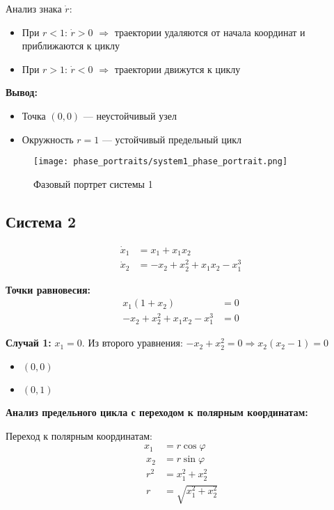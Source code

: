 Анализ знака $\dot{r}$:
\begin{itemize}
\item При $r < 1$: $\dot{r} > 0$ $\Rightarrow$ траектории удаляются от начала координат и приближаются к циклу
\item При $r > 1$: $\dot{r} < 0$ $\Rightarrow$ траектории движутся к циклу
\end{itemize}

\textbf{Вывод:}
\begin{itemize}
\item Точка $(0,0)$ --- неустойчивый узел
\item Окружность $r = 1$ --- устойчивый предельный цикл
\end{itemize}

\begin{figure}[H]
\centering
\texttt{[image: phase\_portraits/system1\_phase\_portrait.png]}
\caption{Фазовый портрет системы 1}
\label{fig:system1_phase_portrait}
\end{figure}

\subsection*{Система 2}

\begin{align}
\dot{x}_1 &= x_1 + x_1 x_2 \\
\dot{x}_2 &= -x_2 + x_2^2 + x_1 x_2 - x_1^3
\end{align}

\textbf{Точки равновесия:}
\begin{align}
x_1(1 + x_2) &= 0 \\
-x_2 + x_2^2 + x_1 x_2 - x_1^3 &= 0
\end{align}

\textbf{Случай 1:} $x_1 = 0$. Из второго уравнения: $-x_2 + x_2^2 = 0 \Rightarrow x_2(x_2 - 1) = 0$
\begin{itemize}
\item $(0, 0)$
\item $(0, 1)$
\end{itemize}

\textbf{Анализ предельного цикла с переходом к полярным координатам:}

Переход к полярным координатам:
\begin{align}
x_1 &= r\cos\varphi \\\
x_2 &= r\sin\varphi \\\
r^2 &= x_1^2 + x_2^2 \\\
r &= \sqrt{x_1^2 + x_2^2}
\end{align}

